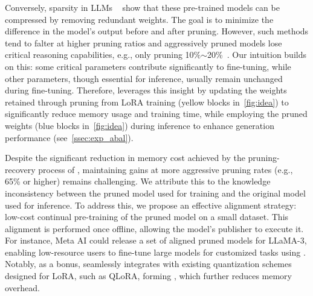 Conversely, sparsity in LLMs ~\citep{zhang2024dynamic,ma2023llmpruner,sun2024a,FrantarA23spasegpt,xia2024sheared} show that these pre-trained models can be compressed by removing redundant weights. 
The goal is to minimize the difference in the model's output before and after pruning.
However, such methods tend to falter at higher pruning ratios and aggressively pruned models lose critical reasoning capabilities, e.g., only pruning 10\%$\sim$20\%~\citep{ma2023llmpruner,FrantarA23spasegpt}.
Our intuition builds on this: 
some critical parameters contribute significantly to fine-tuning, while other parameters, though essential for inference, usually remain unchanged during fine-tuning.
Therefore, \method leverages this insight by updating the weights retained through pruning from LoRA training (yellow blocks in~\cref{fig:idea}) to significantly reduce memory usage and training time, while employing the pruned weights (blue blocks in~\cref{fig:idea}) during inference to enhance generation performance
(see~\cref{ssec:exp_abal}).


Despite the significant 
reduction in memory cost
achieved by the pruning-recovery process of \method, maintaining gains at more aggressive pruning rates (e.g., 65\% or higher) remains challenging. We attribute this to the knowledge inconsistency between the pruned model used for training and the original model used for inference. To address this, we propose an effective alignment strategy: low-cost continual pre-training of the pruned model on a small dataset.
This alignment is performed once offline, allowing the model's publisher to execute it. For instance, Meta AI could release a set of aligned pruned models for LLaMA-3, enabling low-resource users to fine-tune large models for customized tasks using \method.
Notably, as a bonus, \method seamlessly integrates with existing quantization schemes designed for LoRA, such as QLoRA, forming \Qmethod, which further reduces memory overhead.

